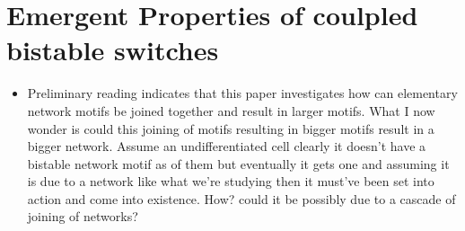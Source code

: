 \documentclass{article}
\begin{document}
\section{Emergent Properties of coulpled bistable switches}

\begin{itemize}

\item Preliminary reading indicates that this paper investigates how can elementary network motifs be joined together and result in larger motifs. What I now wonder is could this joining of motifs resulting in bigger motifs result in a bigger network.  Assume an undifferentiated cell clearly it doesn't have a bistable network motif as of them but eventually it gets one and assuming it is due to a network like what we're studying then it must've been set into action and come into existence. How? could it be possibly due to a cascade of joining of networks? 
\end{itemize}
\end{document}
